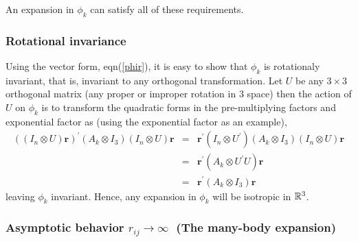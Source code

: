 \documentclass[12pt,thmsa]{article}
\begin{document}
\noindent An expansion in $\phi _k$ can satisfy all of these requirements.

\subsubsection{Rotational invariance}

Using the vector form, eqn(\ref{phir}), it is easy to show that $\phi _k$ is
rotationaly invariant, that is, invariant to any orthogonal transformation.
Let $U$ be any $3\times 3$ orthogonal matrix (any proper or improper
rotation in 3 space) then the action of $U$ on $\phi _k$ is to transform the
quadratic forms in the pre-multiplying factors and exponential factor as
(using the exponential factor as an example), 
\begin{eqnarray}
\left( \left( I_n\otimes U\right) \mathbf{r}\right) ^{\prime }(A_k\otimes
I_3)\left( I_n\otimes U\right) \mathbf{r} &=&\mathbf{r}^{\prime }\left(
I_n\otimes U^{\prime }\right) (A_k\otimes I_3)\left( I_n\otimes U\right) 
\mathbf{r} \\
&=&\mathbf{r}^{\prime }(A_k\otimes U^{\prime }U)\mathbf{r} \\
&=&\mathbf{r}^{\prime }(A_k\otimes I_3)\mathbf{r}
\end{eqnarray}
leaving $\phi _k$ invariant. Hence, any expansion in $\phi _k$ will be
isotropic in $\Bbb{R}^3$.

\subsubsection{Asymptotic behavior $r_{ij}\rightarrow \infty \,\,\,\,$(The
many-body expansion)}
\end{document}
